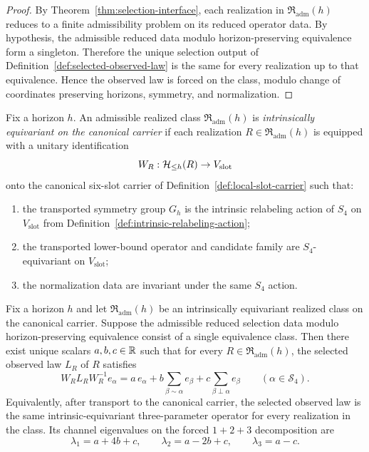 \begin{proof}
By Theorem~\ref{thm:selection-interface}, each realization in
$\mathfrak R_{\mathrm{adm}}(h)$ reduces to a finite admissibility problem on
its reduced operator data. By hypothesis, the admissible reduced data modulo
horizon-preserving equivalence form a singleton. Therefore the unique
selection output of Definition~\ref{def:selected-observed-law} is the same for
every realization up to that equivalence. Hence the observed law is forced on
the class, modulo change of coordinates preserving horizons, symmetry, and
normalization.
\end{proof}

\begin{definition}
\label{def:intrinsically-equivariant-realized-class}
Fix a horizon $h$. An admissible realized class
$\mathfrak R_{\mathrm{adm}}(h)$ is \emph{intrinsically equivariant on the
canonical carrier} if each realization
$R\in\mathfrak R_{\mathrm{adm}}(h)$ is equipped with a unitary identification
\[
W_R:\mathcal{H}_{\le h}(R)\to V_{\mathrm{slot}}
\]
onto the canonical six-slot carrier of
Definition~\ref{def:local-slot-carrier} such that:
\begin{enumerate}[label=(\roman*), leftmargin=2em, itemsep=0.2em]
\item the transported symmetry group $G_h$ is the intrinsic relabeling action
      of $S_4$ on $V_{\mathrm{slot}}$ from
      Definition~\ref{def:intrinsic-relabeling-action};
\item the transported lower-bound operator and candidate family are
      $S_4$-equivariant on $V_{\mathrm{slot}}$;
\item the normalization data are invariant under the same $S_4$ action.
\end{enumerate}
\end{definition}

\begin{theorem}
\label{thm:intrinsic-equivariant-forcing}
Fix a horizon $h$ and let $\mathfrak R_{\mathrm{adm}}(h)$ be an intrinsically
equivariant realized class on the canonical carrier. Suppose the admissible
reduced selection data modulo horizon-preserving equivalence consist of a
single equivalence class. Then there exist unique scalars $a,b,c\in\mathbb{R}$ such
that for every $R\in\mathfrak R_{\mathrm{adm}}(h)$, the selected observed law
$L_R$ of $R$ satisfies
\[
W_R L_R W_R^{-1} e_\alpha
=
a\,e_\alpha
+
b\sum_{\beta\sim\alpha}e_\beta
+
c\sum_{\beta\perp\alpha}e_\beta
\qquad(\alpha\in\mathcal S_4).
\]
Equivalently, after transport to the canonical carrier, the selected observed
law is the same intrinsic-equivariant three-parameter operator for every
realization in the class. Its channel eigenvalues on the forced $1+2+3$
decomposition are
\[
\lambda_1=a+4b+c,\qquad
\lambda_2=a-2b+c,\qquad
\lambda_3=a-c.
\]
\end{theorem}

